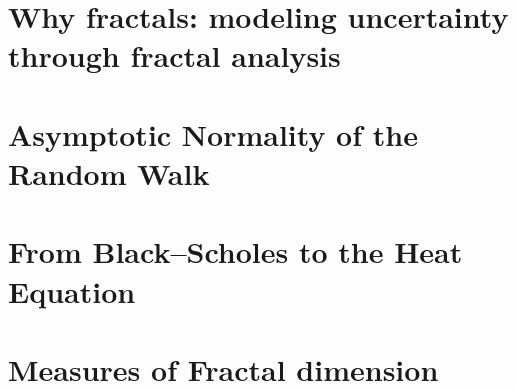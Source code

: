 \documentclass[english]{article}
\begin{document}
\section{Why fractals: modeling uncertainty through fractal analysis}


\newpage

\appendix

\section{Asymptotic Normality of the Random Walk} \label{app:A}


\section{From Black–Scholes to the Heat Equation} \label{app:B}


\section{Measures of Fractal dimension} \label{app:C}


\newpage
\nocite{*}
\printbibliography
\end{document}
